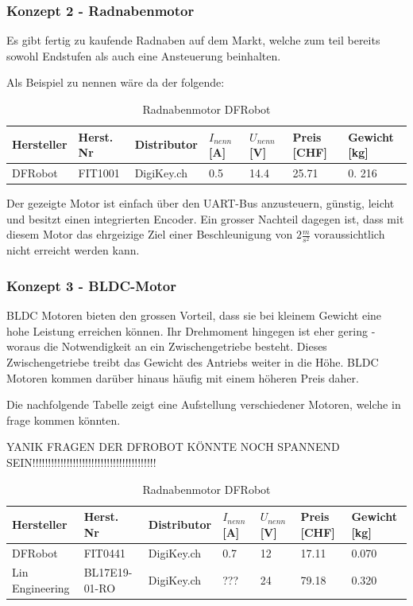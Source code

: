 \documentclass[main.tex]{subfiles} %
\begin{document}
\subsubsection{Konzept 2 - Radnabenmotor} %

Es gibt fertig zu kaufende Radnaben auf dem Markt, welche zum teil bereits
sowohl Endstufen als auch eine Ansteuerung beinhalten.

Als Beispiel zu nennen wäre da der folgende:

\begin{table}[h]
    \centering
    \begin{tabular}{|p{2cm}|p{3cm}|p{2cm}|p{1cm}|p{1cm}|p{1cm}|p{1.5cm}|}
        \hline
        Hersteller & Herst. Nr & Distributor & $I_{nenn} $ [A] & $U_{nenn}$ [V] & Preis [CHF] & Gewicht [kg] \\ \hline
        DFRobot    & FIT1001   & DigiKey.ch  & 0.5             & 14.4           & 25.71       & 0. 216       \\ \hline
    \end{tabular}
    \caption{Radnabenmotor DFRobot}
\end{table}

Der gezeigte Motor ist einfach über den UART-Bus anzusteuern, günstig, leicht
und besitzt einen integrierten Encoder. Ein grosser Nachteil dagegen ist, dass
mit diesem Motor das ehrgeizige Ziel einer Beschleunigung von $2 \frac{m}{s^2}$
voraussichtlich nicht erreicht werden kann.

\subsubsection{Konzept 3 - BLDC-Motor} %

BLDC Motoren bieten den grossen Vorteil, dass sie bei kleinem Gewicht eine hohe
Leistung erreichen können. Ihr Drehmoment hingegen ist eher gering - woraus die
Notwendigkeit an ein Zwischengetriebe besteht. Dieses Zwischengetriebe treibt
das Gewicht des Antriebs weiter in die Höhe. BLDC Motoren kommen darüber hinaus
häufig mit einem höheren Preis daher.

Die nachfolgende Tabelle zeigt eine Aufstellung verschiedener Motoren, welche
in frage kommen könnten.

YANIK FRAGEN DER DFROBOT KÖNNTE NOCH SPANNEND
SEIN!!!!!!!!!!!!!!!!!!!!!!!!!!!!!!!!!!!!!!!!

\begin{table}[h]
    \centering
    \begin{tabular}{|p{2cm}|p{3cm}|p{2cm}|p{1cm}|p{1cm}|p{1cm}|p{1.5cm}|}
        \hline
        Hersteller      & Herst. Nr     & Distributor & $I_{nenn} $ [A] & $U_{nenn}$ [V] & Preis [CHF] & Gewicht [kg] \\ \hline
        DFRobot         & FIT0441       & DigiKey.ch  & 0.7             & 12             & 17.11       & 0.070        \\ \hline
        Lin Engineering & BL17E19-01-RO & DigiKey.ch  & ???             & 24             & 79.18       & 0.320        \\ \hline
    \end{tabular}
    \caption{Radnabenmotor DFRobot}
\end{table}
\end{document}
